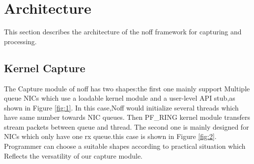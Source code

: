 \documentclass[conference]{IEEEtran}
\begin{document}
\section{Architecture}
This section describes the architecture of the noff framework for capturing and processing.
\subsection{Kernel Capture}
The Capture module of noff has two shapes:the first one mainly support Multiple queue NICs which use a loadable kernel module and a user-level API stub,as shown in Figure \ref{fig:1}. In this case,Noff would initialize several threads which have same number towards NIC queues.
Then PF\_RING kernel module transfers stream packets between queue and thread.
\newline\indent The second one is mainly designed for NICs which only have one rx queue.this case is shown in Figure \ref{fig:2}. Programmer can choose a suitable shapes according to practical situation which Reflects the versatility of our capture module.
\end{document}
